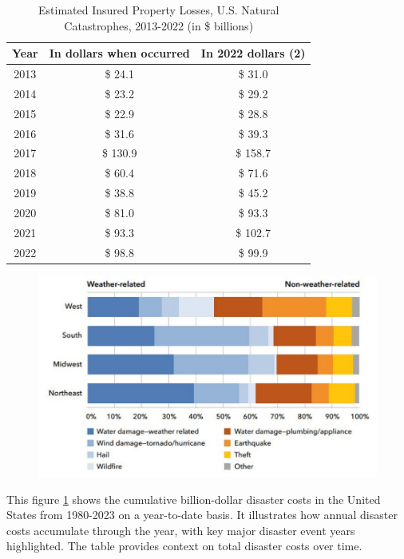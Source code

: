 \documentclass[12pt]{article}
\begin{document}
\begin{table}[h]
    \caption{Estimated Insured Property Losses, U.S. Natural Catastrophes, 2013-2022 (in \$ billions)}
    \label{tab:insured_prop_losses}
    \centering
    \begin{tabular}{|c|c|c|}
        \hline
        Year & In dollars when occurred & In 2022 dollars (2) \\
        \hline
        2013 & \$ 24.1 & \$ 31.0 \\
        2014 & \$ 23.2 & \$ 29.2 \\
        2015 & \$ 22.9 & \$ 28.8 \\
        2016 & \$ 31.6 & \$ 39.3 \\
        2017 & \$ 130.9 & \$ 158.7 \\
        2018 & \$ 60.4 & \$ 71.6 \\
        2019 & \$ 38.8 & \$ 45.2 \\
        2020 & \$ 81.0 & \$ 93.3 \\
        2021 & \$ 93.3 & \$ 102.7 \\
        2022 & \$ 98.8 & \$ 99.9 \\
        \hline
    \end{tabular}
    \cite{iii}
\end{table}    
    
\begin{figure}[ht]
    \centering
    \label{fig:disaster_threats}
    \includegraphics[width=0.8\linewidth]{NAIC HO threats.pdf}
    \cite{naic}
\end{figure}

This figure \ref{fig:disaster_threats} shows the cumulative billion-dollar disaster costs in the United States from 1980-2023 on a year-to-date basis. It 
illustrates how annual disaster costs accumulate through the year, with key major disaster event years highlighted. The table 
provides context on total disaster costs over time.
\end{document}
